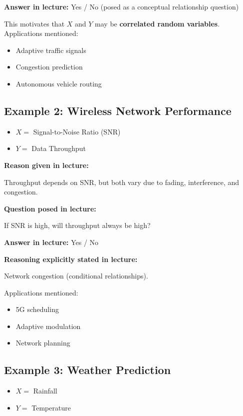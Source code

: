 \documentclass[12pt]{article}
\begin{document}
\noindent \textbf{Answer in lecture:} Yes / No (posed as a conceptual relationship question)

This motivates that \(X\) and \(Y\) may be \textbf{correlated random variables}. Applications mentioned:

\begin{itemize}
    \item Adaptive traffic signals
    \item Congestion prediction
    \item Autonomous vehicle routing
\end{itemize}

\subsection*{Example 2: Wireless Network Performance}

\begin{itemize}
    \item \(X =\) Signal-to-Noise Ratio (SNR)
    \item \(Y =\) Data Throughput
\end{itemize}

\noindent \textbf{Reason given in lecture:}

Throughput depends on SNR, but both vary due to fading, interference, and congestion.

\noindent \textbf{Question posed in lecture:}

If SNR is high, will throughput always be high?

\noindent \textbf{Answer in lecture:} Yes / No

\noindent \textbf{Reasoning explicitly stated in lecture:}

Network congestion (conditional relationships).

Applications mentioned:

\begin{itemize}
    \item 5G scheduling
    \item Adaptive modulation
    \item Network planning
\end{itemize}

\subsection*{Example 3: Weather Prediction}

\begin{itemize}
    \item \(X =\) Rainfall
    \item \(Y =\) Temperature
\end{itemize}
\end{document}
